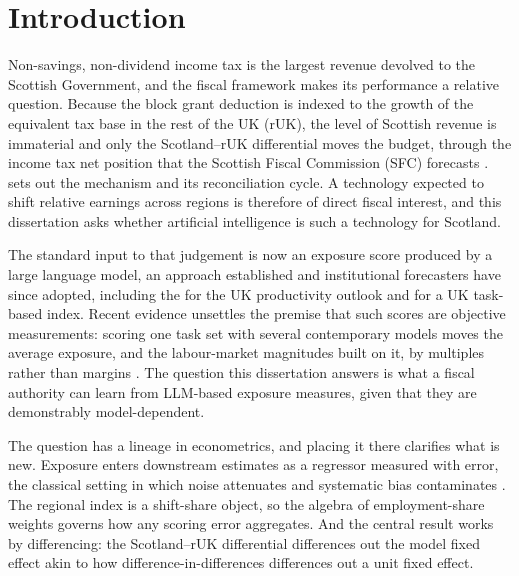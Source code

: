 \section{Introduction}\label{sec:intro}

Non-savings, non-dividend income tax is the largest revenue devolved to the Scottish Government, and the fiscal framework makes its performance a relative question. Because the block grant deduction is indexed to the growth of the equivalent tax base in the rest of the UK (rUK), the level of Scottish revenue is immaterial and only the Scotland--rUK differential moves the budget, through the income tax net position that the Scottish Fiscal Commission (SFC) forecasts \citep{gov2023, sfc2026}.  sets out the mechanism and its reconciliation cycle. A technology expected to shift relative earnings across regions is therefore of direct fiscal interest, and this dissertation asks whether artificial intelligence is such a technology for Scotland.

The standard input to that judgement is now an exposure score produced by a large language model, an approach \citet{eloundou2024} established and institutional forecasters have since adopted, including the \citet{obr2025} for the UK productivity outlook and \citet{henseke2025} for a UK task-based index. Recent evidence unsettles the premise that such scores are objective measurements: scoring one task set with several contemporary models moves the average exposure, and the labour-market magnitudes built on it, by multiples rather than margins \citep{yin2026}. The question this dissertation answers is what a fiscal authority can learn from LLM-based exposure measures, given that they are demonstrably model-dependent.

The question has a lineage in econometrics, and placing it there clarifies what is new. Exposure enters downstream estimates as a regressor measured with error, the classical setting in which noise attenuates and systematic bias contaminates \citep{bound1991}. %
The regional index is a shift-share object, so the algebra of employment-share weights governs how any scoring error aggregates. And the central result works by differencing: the Scotland--rUK differential differences out the model fixed effect akin to how difference-in-differences differences out a unit fixed effect.

